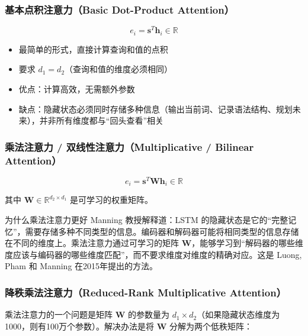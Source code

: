 \documentclass[a4paper]{article}
\begin{document}



\subsubsection{基本点积注意力（Basic Dot-Product Attention）}

$$e_i = \mathbf{s}^T \mathbf{h}_i \in \mathbb{R}$$

\begin{itemize}
    \item 最简单的形式，直接计算查询和值的点积
    \item 要求 $d_1 = d_2$（查询和值的维度必须相同）
    \item 优点：计算高效，无需额外参数
    \item 缺点：隐藏状态必须同时存储多种信息（输出当前词、记录语法结构、规划未来），并非所有维度都与``回头查看''相关
\end{itemize}

\subsubsection{乘法注意力 / 双线性注意力（Multiplicative / Bilinear Attention）}

$$e_i = \mathbf{s}^T \mathbf{W} \mathbf{h}_i \in \mathbb{R}$$

其中 $\mathbf{W} \in \mathbb{R}^{d_2 \times d_1}$ 是可学习的权重矩阵。




\begin{knowledgebox}{为什么乘法注意力更好}
Manning 教授解释道：LSTM 的隐藏状态是它的``完整记忆''，需要存储多种不同类型的信息。编码器和解码器可能将相同类型的信息存储在不同的维度上。乘法注意力通过可学习的矩阵 $\mathbf{W}$，能够学习到``解码器的哪些维度应该与编码器的哪些维度匹配''，而不要求维度对维度的精确对应。这是 Luong, Pham 和 Manning 在2015年提出的方法。
\end{knowledgebox}

\subsubsection{降秩乘法注意力（Reduced-Rank Multiplicative Attention）}

乘法注意力的一个问题是矩阵 $\mathbf{W}$ 的参数量为 $d_1 \times d_2$（如果隐藏状态维度为1000，则有100万个参数）。解决办法是将 $\mathbf{W}$ 分解为两个低秩矩阵：
\end{document}
